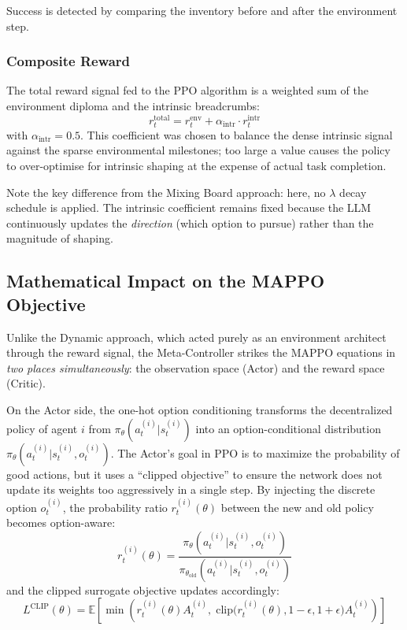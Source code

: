 Success is detected by comparing the inventory before and after the environment step.

\subsubsection{Composite Reward}

The total reward signal fed to the PPO algorithm is a weighted sum of the environment diploma and the intrinsic breadcrumbs:
\begin{equation}
\label{eq:hrl_total_reward}
\boxed{
    r_t^{\text{total}}
    = r_t^{\text{env}}
    + \alpha_{\text{intr}} \cdot r_t^{\text{intr}}
}
\end{equation}
with $\alpha_{\text{intr}} = 0.5$. This coefficient was chosen to balance the dense intrinsic signal against the sparse environmental milestones; too large a value causes the policy to over-optimise for intrinsic shaping at the expense of actual task completion.

Note the key difference from the Mixing Board approach: here, no $\lambda$ decay schedule is applied. The intrinsic coefficient remains fixed because the LLM continuously updates the \emph{direction} (which option to pursue) rather than the magnitude of shaping.

\subsection{Mathematical Impact on the MAPPO Objective}
\label{sec:hrl_math_impact}

Unlike the Dynamic approach, which acted purely as an environment architect through the reward signal, the Meta-Controller strikes the MAPPO equations in \emph{two places simultaneously}: the observation space (Actor) and the reward space (Critic).

On the Actor side, the one-hot option conditioning transforms the decentralized policy of agent $i$ from $\pi_\theta(a_t^{(i)} \vert{} s_t^{(i)})$ into an option-conditional distribution $\pi_\theta(a_t^{(i)} \vert{} s_t^{(i)}, o_t^{(i)})$. 
The Actor's goal in PPO is to maximize the probability of good actions, but it uses a ``clipped objective'' to ensure the network does not update its weights too aggressively in a single step. 
By injecting the discrete option $o_t^{(i)}$, the probability ratio $r_t^{(i)}(\theta)$ between the new and old policy becomes option-aware:
\begin{equation}
    r_t^{(i)}(\theta) = \frac{\pi_\theta(a_t^{(i)} \vert{} s_t^{(i)}, o_t^{(i)})}{\pi_{\theta_{\text{old}}}(a_t^{(i)} \vert{} s_t^{(i)}, o_t^{(i)})}
\end{equation}
and the clipped surrogate objective updates accordingly:
\begin{equation}
    L^{\text{CLIP}}(\theta) = \mathbb{E} \left[ \min\left( r_t^{(i)}(\theta) A_t^{(i)},\; \text{clip}\bigl(r_t^{(i)}(\theta), 1 - \epsilon, 1 + \epsilon\bigr) A_t^{(i)} \right) \right]
\end{equation}

